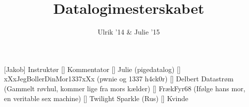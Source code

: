 \documentclass[a4paper,11pt]{article}
\title{Datalogimesterskabet}
\author{Ulrik '14 \& Julie '15}
\begin{document}
\maketitle

\begin{roles}
[Jakob] Instruktør
[] Kommentator
[] Julie (pigedatalog)
[] xXxJegBollerDinMor1337xXx (pwnie og 1337 h4ck0r)
[] Delbert Datastrøm (Gammelt røvhul, kommer lige fra mors kælder)
[] FrækFyr68 (Ifølge hans mor, en veritable sex machine)
[] Twilight Sparkle (Rus)
[] Kvinde

\end{roles}

\begin{props}
\end{props}
\end{document}
